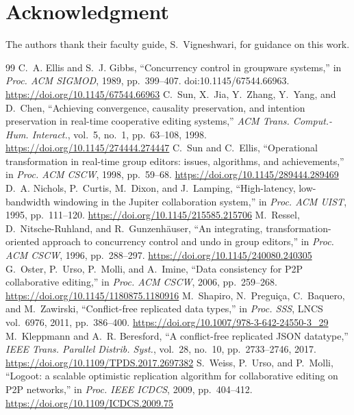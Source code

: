 \documentclass[conference]{IEEEtran}
\begin{document}
\section*{Acknowledgment}
The authors thank their faculty guide, S.~Vigneshwari, for guidance on this work.

\begin{thebibliography}{99}
 C.~A. Ellis and S.~J. Gibbs, ``Concurrency control in groupware systems,'' in \emph{Proc. ACM SIGMOD}, 1989, pp.~399--407. doi:10.1145/67544.66963. \url{https://doi.org/10.1145/67544.66963}
 C.~Sun, X.~Jia, Y.~Zhang, Y.~Yang, and D.~Chen, ``Achieving convergence, causality preservation, and intention preservation in real-time cooperative editing systems,'' \emph{ACM Trans. Comput.-Hum. Interact.}, vol.~5, no.~1, pp.~63--108, 1998. \url{https://doi.org/10.1145/274444.274447}
 C.~Sun and C.~Ellis, ``Operational transformation in real-time group editors: issues, algorithms, and achievements,'' in \emph{Proc. ACM CSCW}, 1998, pp.~59--68. \url{https://doi.org/10.1145/289444.289469}
 D.~A. Nichols, P.~Curtis, M.~Dixon, and J.~Lamping, ``High-latency, low-bandwidth windowing in the Jupiter collaboration system,'' in \emph{Proc. ACM UIST}, 1995, pp.~111--120. \url{https://doi.org/10.1145/215585.215706}
 M.~Ressel, D.~Nitsche-Ruhland, and R.~Gunzenh\"auser, ``An integrating, transformation-oriented approach to concurrency control and undo in group editors,'' in \emph{Proc. ACM CSCW}, 1996, pp.~288--297. \url{https://doi.org/10.1145/240080.240305}
 G.~Oster, P.~Urso, P.~Molli, and A.~Imine, ``Data consistency for P2P collaborative editing,'' in \emph{Proc. ACM CSCW}, 2006, pp.~259--268. \url{https://doi.org/10.1145/1180875.1180916}
 M.~Shapiro, N.~Pregui\c{c}a, C.~Baquero, and M.~Zawirski, ``Conflict-free replicated data types,'' in \emph{Proc. SSS}, LNCS vol.~6976, 2011, pp.~386--400. \url{https://doi.org/10.1007/978-3-642-24550-3_29}
 M.~Kleppmann and A.~R. Beresford, ``A conflict-free replicated JSON datatype,'' \emph{IEEE Trans. Parallel Distrib. Syst.}, vol.~28, no.~10, pp.~2733--2746, 2017. \url{https://doi.org/10.1109/TPDS.2017.2697382}
 S.~Weiss, P.~Urso, and P.~Molli, ``Logoot: a scalable optimistic replication algorithm for collaborative editing on P2P networks,'' in \emph{Proc. IEEE ICDCS}, 2009, pp.~404--412. \url{https://doi.org/10.1109/ICDCS.2009.75}

\end{thebibliography}
\end{document}
